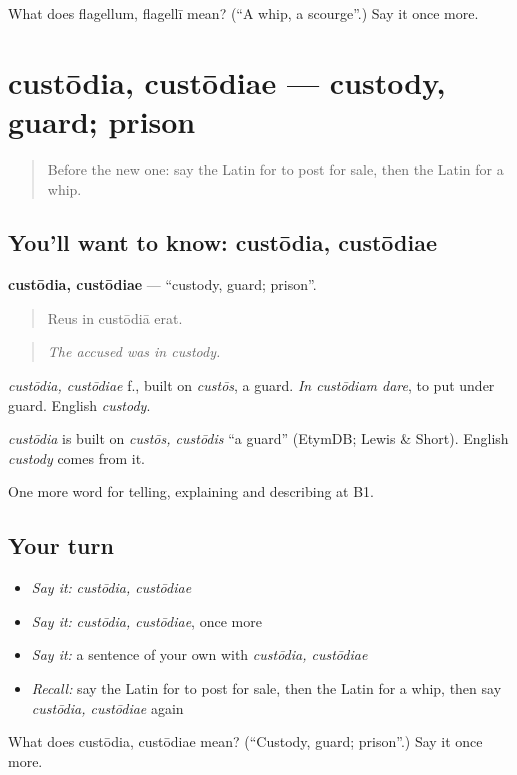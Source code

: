 \begin{tcolorbox}[breakable,colback=teal!4,colframe=teal!35!black,title={Before you move on}]
What does flagellum, flagellī mean? (\textquotedblleft{}A whip, a scourge\textquotedblright{}.) Say it once more.
\end{tcolorbox}
\section[custōdia, custōdiae]{custōdia, custōdiae — custody, guard; prison}

\label{lesson:LA-C415-custodia}



\begin{quote}
Before the new one: say the Latin for to post for sale, then the Latin for a whip.
\end{quote}

\subsection*{You'll want to know: custōdia, custōdiae}
\textbf{custōdia, custōdiae} — \textquotedblleft{}custody, guard; prison\textquotedblright{}.

\begin{quote}
Reus in custōdiā erat.
\end{quote}

\begin{quote}
\emph{The accused was in custody.}
\end{quote}

\emph{custōdia, custōdiae} f., built on \emph{custōs}, a guard. \emph{In custōdiam dare}, to put under guard. English \emph{custody}.

\begin{cousinweb}
\emph{custōdia} is built on \emph{custōs, custōdis} \textquotedblleft{}a guard\textquotedblright{} (EtymDB; Lewis \& Short). English \emph{custody} comes from it.
\end{cousinweb}

\begin{grammarlens}[title={What you've built}]
One more word for telling, explaining and describing at B1.
\end{grammarlens}

\subsection*{Your turn}
\begin{itemize}
\raggedright
  \item \emph{Say it:} \emph{custōdia, custōdiae}
  \item \emph{Say it:} \emph{custōdia, custōdiae}, once more
  \item \emph{Say it:} a sentence of your own with \emph{custōdia, custōdiae}
  \item \emph{Recall:} say the Latin for to post for sale, then the Latin for a whip, then say \emph{custōdia, custōdiae} again
\end{itemize}

\begin{tcolorbox}[breakable,colback=teal!4,colframe=teal!35!black,title={Before you move on}]
What does custōdia, custōdiae mean? (\textquotedblleft{}Custody, guard; prison\textquotedblright{}.) Say it once more.
\end{tcolorbox}
